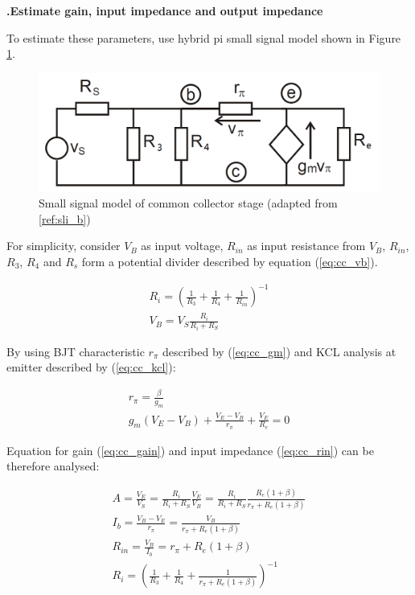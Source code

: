\documentclass[a4paper,notitlepage,10pt]{report}
\newcommand{\tab}{\hspace{0.75cm}}
\newcommand{\fontSubHeading}{\fontsize{10pt}{11pt}\selectfont}
\newcounter{sections}
\newcounter{subsections}[sections]
\begin{document}
\begin{multicols}{2}
\fontSubHeading
{}
\textbf{.\tab Estimate gain, input impedance and output impedance}

To estimate these parameters, use hybrid pi small signal model shown in Figure \ref{fig:cc_small}.
\parskip=0pt

\begin{figure}[H]
	\centering
	\includegraphics[width=\columnwidth]{cc_small}
	\caption{Small signal model of common collector stage (adapted from \ref{ref:sli_b})}
	\label{fig:cc_small}
\end{figure}

For simplicity, consider $V_B$ as input voltage, $R_{in}$ as input resistance from $V_B$, $R_{in}$, $R_3$, $R_4$ and $R_s$ form a potential divider described by equation (\ref{eq:cc_vb}).
\parskip=0pt

\begin{gather}
	R_i = \left( \frac{1}{R_3} + \frac{1}{R_4} + \frac{1}{R_{in}} \right)^{-1} \nonumber \\
	V_B = V_S\frac{R_i}{R_i + R_S}
	\label{eq:cc_vb}
\end{gather}
\parskip=6pt

By using BJT characteristic $r_\pi$ described by (\ref{eq:cc_gm}) and KCL analysis at emitter described by (\ref{eq:cc_kcl}):
\parskip=0pt

\begin{gather}
	\label{eq:cc_gm}
	r_\pi = \frac{\beta}{g_m} \\
	\label{eq:cc_kcl}
	g_m \left( V_E - V_B \right) + \frac{V_E - V_B}{r_\pi} + \frac{V_E}{R_e} = 0
\end{gather}
\parskip=6pt

Equation for gain (\ref{eq:cc_gain}) and input impedance (\ref{eq:cc_rin}) can be therefore analysed:
\parskip=0pt

\begin{gather}
	\label{eq:cc_gain}
	A = \frac{V_E}{V_S} = \frac{R_i}{R_i + R_S}\frac{V_E}{V_B} = \frac{R_i}{R_i + R_S}\frac{R_e\left( 1 + \beta \right)}{r_\pi + R_e\left( 1 + \beta \right)} \\
	I_b = \frac{V_B - V_E}{r_\pi} = \frac{V_B}{r_\pi + R_e\left( 1 + \beta \right)} \nonumber \\
	R_{in} = \frac{V_B}{I_b} = r_\pi + R_e(1 + \beta) \nonumber \\
	\label{eq:cc_rin}
	R_i = \left( \frac{1}{R_3} + \frac{1}{R_4} + \frac{1}{r_\pi + R_e\left( 1 + \beta \right)}\right) ^{-1}
\end{gather}
\parskip=6pt


\end{multicols}
\end{document}
